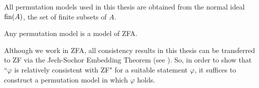 All permutation models used in this thesis are obtained from the normal ideal $\textup{fin}(A)$, the set of finite subsets of $A$.

\begin{theorem}
    Any permutation model is a model of ZFA.
\end{theorem}


Although we work in ZFA, all consistency results in this thesis can be transferred to ZF via the Jech-Sochor Embedding Theorem (see \cite[Chapter 6]{Jech}). So, in order to show that ``$\varphi$ is relatively consistent with ZF" for a suitable statement $\varphi$, it suffices to construct a permutation model in which $\varphi$ holds.

